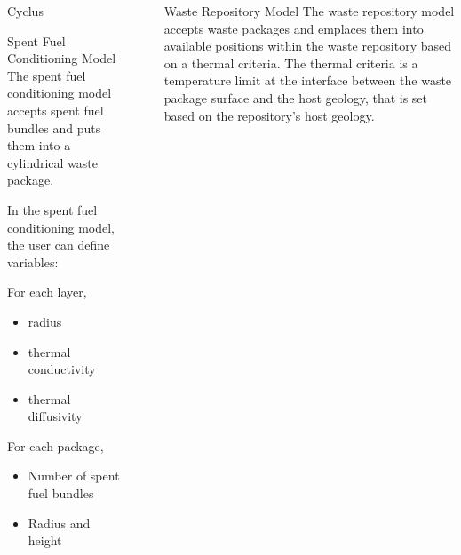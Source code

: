 \documentclass[final]{beamer}
\newlength{\sepwid}
\newlength{\onecolwid}
\newlength{\threecolwid}
\begin{document}
\begin{frame}[t]
\begin{columns}[t,totalwidth=\threecolwid]
\begin{column}{\onecolwid}
\begin{block}{Cyclus}
\end{block}

\begin{block}{Spent Fuel Conditioning Model}
The spent fuel conditioning model accepts spent fuel bundles and puts them into a cylindrical
waste package. 
	
In the spent fuel conditioning model, the user can define variables:  

For each layer, 
\begin{itemize}
	\item radius 
	\item thermal conductivity 
	\item thermal diffusivity
\end{itemize}
For each package,
\begin{itemize}
	\item Number of spent fuel bundles
	\item Radius and height
\end{itemize}

\end{block}


\end{column} %

\begin{column}{\sepwid}\end{column} %



\begin{column}{\onecolwid} %

\begin{block}{Waste Repository Model}
The waste repository model accepts waste packages and emplaces them into 
available positions within the waste repository based on a thermal criteria.  
The thermal criteria is a temperature limit at the interface between the waste 
package surface and the host geology, that is set based on the repository's host geology.


\end{block}
\end{column}
\end{columns}
\end{frame}
\end{document}
